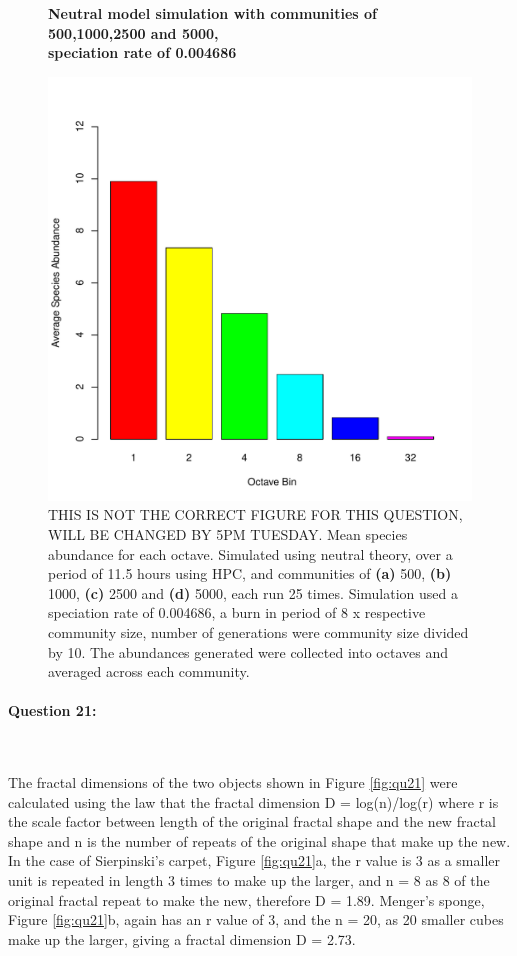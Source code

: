 \documentclass{article}
\begin{document}
\begin{figure}[H]
	\centering
	\textbf{Neutral model simulation with communities of 500,1000,2500 and 5000, \\ speciation rate of 0.004686}\par\medskip
	\includegraphics[width=\linewidth]{../Results/octave_plot.pdf}
	\caption{THIS IS NOT THE CORRECT FIGURE FOR THIS QUESTION, WILL BE CHANGED BY 5PM TUESDAY. Mean species abundance for each octave. Simulated using neutral theory, over a period of 11.5 hours using HPC, and communities of \textbf{(a)} 500, \textbf{(b)} 1000, \textbf{(c)} 2500 and \textbf{(d)} 5000, each run 25 times. Simulation used a speciation rate of 0.004686, a burn in period of 8 x respective community size, number of generations were community size divided by 10. The abundances generated were collected into octaves and averaged across each community.}
	\label{fig:q20}
\end{figure}

\newpage
\paragraph{Question 21:}\

\noindent \newline The fractal dimensions of the two objects shown in Figure \ref{fig:qu21} were calculated using the law that the fractal dimension D = log(n)/log(r) where r is the scale factor between length of the original fractal shape and the new fractal shape and n is the number of repeats of the original shape that make up the new. In the case of Sierpinski's carpet, Figure \ref{fig:qu21}a, the r value is 3 as a smaller unit is repeated in length 3 times to make up the larger, and n = 8 as 8 of the original fractal repeat to make the new, therefore D = 1.89. Menger's sponge, Figure \ref{fig:qu21}b, again has an r value of 3, and the n = 20, as 20 smaller cubes make up the larger, giving a fractal dimension D = 2.73.
\end{document}

